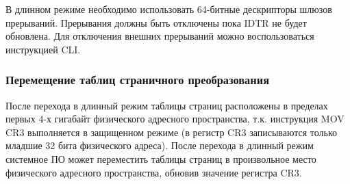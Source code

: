 В длинном режиме необходимо использовать 64-битные дескрипторы шлюзов прерываний. Прерывания должны быть
отключены пока IDTR не будет обновлена. Для отключения внешних прерываний можно воспользоваться инструкцией CLI.

\subsubsection*{Перемещение таблиц страничного преобразования}
После перехода в длинный режим таблицы страниц расположены в пределах первых 4-х гигабайт физического
адресного пространства, т.к. инструкция MOV CR3 выполняется в защищенном режиме (в регистр CR3 записываются
только младшие 32 бита физического адреса). После перехода в длинный режим
системное ПО может переместить таблицы страниц в произвольное место физического адресного пространства,
обновив значение регистра CR3.


